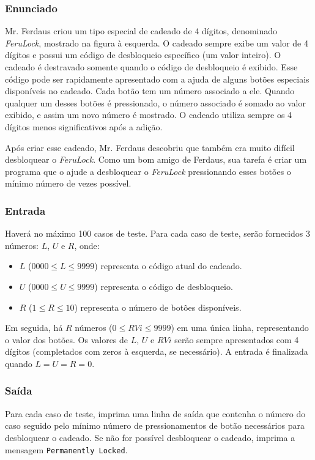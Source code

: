 \subsubsection*{Enunciado}
Mr. Ferdaus criou um tipo especial de cadeado de 4 dígitos, denominado \textit{FeruLock}, mostrado na figura à esquerda. O cadeado sempre exibe um valor de 4 dígitos e possui um código de desbloqueio específico (um valor inteiro). O cadeado é destravado somente quando o código de desbloqueio é exibido. Esse código pode ser rapidamente apresentado com a ajuda de alguns botões especiais disponíveis no cadeado. Cada botão tem um número associado a ele. Quando qualquer um desses botões é pressionado, o número associado é somado ao valor exibido, e assim um novo número é mostrado. O cadeado utiliza sempre os 4 dígitos menos significativos após a adição.

Após criar esse cadeado, Mr. Ferdaus descobriu que também era muito difícil desbloquear o \textit{FeruLock}. Como um bom amigo de Ferdaus, sua tarefa é criar um programa que o ajude a desbloquear o \textit{FeruLock} pressionando esses botões o mínimo número de vezes possível.

\subsubsection*{Entrada}
Haverá no máximo 100 casos de teste. Para cada caso de teste, serão fornecidos 3 números: \(L\), \(U\) e \(R\), onde:
\begin{itemize}
    \item \(L\) (\(0000 \le L \le 9999\)) representa o código atual do cadeado.
    \item \(U\) (\(0000 \le U \le 9999\)) representa o código de desbloqueio.
    \item \(R\) (\(1 \le R \le 10\)) representa o número de botões disponíveis.
\end{itemize}
Em seguida, há \(R\) números (\(0 \le RVi \le 9999\)) em uma única linha, representando o valor dos botões. Os valores de \(L\), \(U\) e \(RVi\) serão sempre apresentados com 4 dígitos (completados com zeros à esquerda, se necessário). A entrada é finalizada quando \(L = U = R = 0\).

\subsubsection*{Saída}
Para cada caso de teste, imprima uma linha de saída que contenha o número do caso seguido pelo mínimo número de pressionamentos de botão necessários para desbloquear o cadeado. Se não for possível desbloquear o cadeado, imprima a mensagem \texttt{Permanently Locked}.

